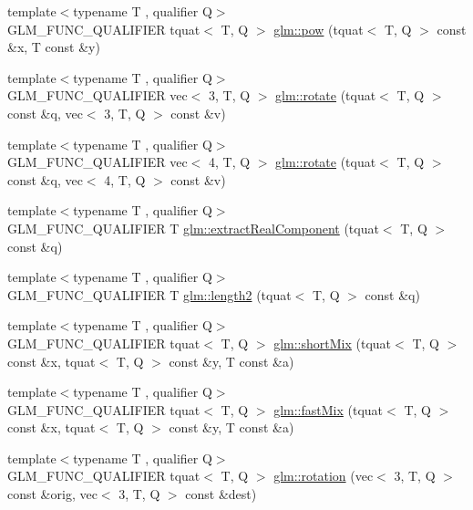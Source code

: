 \begin{DoxyCompactItemize}
\item 
{\footnotesize template$<$typename T , qualifier Q$>$ }\\G\+L\+M\+\_\+\+F\+U\+N\+C\+\_\+\+Q\+U\+A\+L\+I\+F\+I\+ER tquat$<$ T, Q $>$ \hyperlink{group__gtx__quaternion_gad382fc37392d537aecf2245a4597d8a3}{glm\+::pow} (tquat$<$ T, Q $>$ const \&x, T const \&y)
\item 
{\footnotesize template$<$typename T , qualifier Q$>$ }\\G\+L\+M\+\_\+\+F\+U\+N\+C\+\_\+\+Q\+U\+A\+L\+I\+F\+I\+ER vec$<$ 3, T, Q $>$ \hyperlink{group__gtx__quaternion_ga49730f975e7f0ee3862a20b767aba583}{glm\+::rotate} (tquat$<$ T, Q $>$ const \&q, vec$<$ 3, T, Q $>$ const \&v)
\item 
{\footnotesize template$<$typename T , qualifier Q$>$ }\\G\+L\+M\+\_\+\+F\+U\+N\+C\+\_\+\+Q\+U\+A\+L\+I\+F\+I\+ER vec$<$ 4, T, Q $>$ \hyperlink{group__gtx__quaternion_ga97a5f8af1d63056b85a53ac28042fe77}{glm\+::rotate} (tquat$<$ T, Q $>$ const \&q, vec$<$ 4, T, Q $>$ const \&v)
\item 
{\footnotesize template$<$typename T , qualifier Q$>$ }\\G\+L\+M\+\_\+\+F\+U\+N\+C\+\_\+\+Q\+U\+A\+L\+I\+F\+I\+ER T \hyperlink{group__gtx__quaternion_ga312385d0a8caa24c1daaa1d00ce4c2d3}{glm\+::extract\+Real\+Component} (tquat$<$ T, Q $>$ const \&q)
\item 
{\footnotesize template$<$typename T , qualifier Q$>$ }\\G\+L\+M\+\_\+\+F\+U\+N\+C\+\_\+\+Q\+U\+A\+L\+I\+F\+I\+ER T \hyperlink{group__gtx__quaternion_ga229bacc3051770b030042fe266f7b0cb}{glm\+::length2} (tquat$<$ T, Q $>$ const \&q)
\item 
{\footnotesize template$<$typename T , qualifier Q$>$ }\\G\+L\+M\+\_\+\+F\+U\+N\+C\+\_\+\+Q\+U\+A\+L\+I\+F\+I\+ER tquat$<$ T, Q $>$ \hyperlink{group__gtx__quaternion_gaf0ad63ac791b1f9a587e363837c2d538}{glm\+::short\+Mix} (tquat$<$ T, Q $>$ const \&x, tquat$<$ T, Q $>$ const \&y, T const \&a)
\item 
{\footnotesize template$<$typename T , qualifier Q$>$ }\\G\+L\+M\+\_\+\+F\+U\+N\+C\+\_\+\+Q\+U\+A\+L\+I\+F\+I\+ER tquat$<$ T, Q $>$ \hyperlink{group__gtx__quaternion_gac5c77bc74dfc750aaf271d68f271bf2b}{glm\+::fast\+Mix} (tquat$<$ T, Q $>$ const \&x, tquat$<$ T, Q $>$ const \&y, T const \&a)
\item 
{\footnotesize template$<$typename T , qualifier Q$>$ }\\G\+L\+M\+\_\+\+F\+U\+N\+C\+\_\+\+Q\+U\+A\+L\+I\+F\+I\+ER tquat$<$ T, Q $>$ \hyperlink{group__gtx__quaternion_ga5a729f33cbd904c9ca14cdf25d0a07e4}{glm\+::rotation} (vec$<$ 3, T, Q $>$ const \&orig, vec$<$ 3, T, Q $>$ const \&dest)

\end{DoxyCompactItemize}
